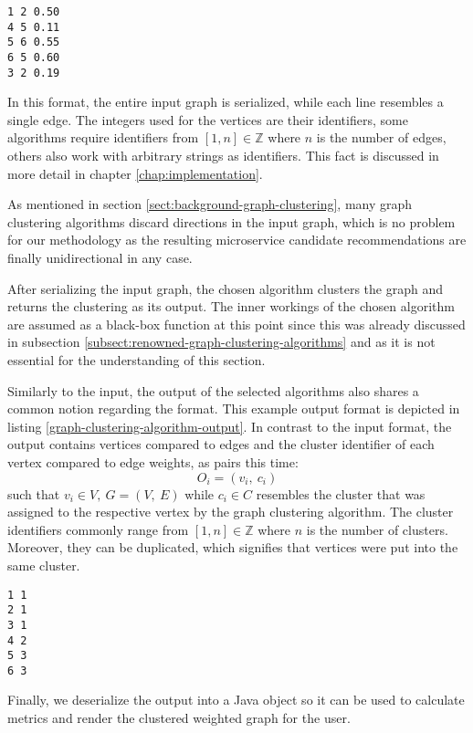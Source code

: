 \documentclass[12pt,a4paper]{report}
\begin{document}
\begin{lstlisting}[caption=Example graph clustering algorithm input, label=graph-clustering-algorithm-input, breaklines=true]
1 2 0.50
4 5 0.11
5 6 0.55
6 5 0.60
3 2 0.19
\end{lstlisting}

In this format, the entire input graph is serialized, while each line resembles
a single edge. The integers used for the vertices are their identifiers, some
algorithms require identifiers from \([1, n] \in \mathbb{Z}\) where \(n\) is
the number of edges, others also work with arbitrary strings as identifiers.
This fact is discussed in more detail in chapter \ref{chap:implementation}.

As mentioned in section \ref{sect:background-graph-clustering}, many graph
clustering algorithms discard directions in the input graph, which is no
problem for our methodology as the resulting microservice candidate
recommendations are finally unidirectional in any case.

After serializing the input graph, the chosen algorithm clusters the graph and
returns the clustering as its output. The inner workings of the chosen
algorithm are assumed as a black-box function at this point since this was
already discussed in subsection \ref{subsect:renowned-graph-clustering-algorithms}
and as it is not essential for the understanding of this section.

Similarly to the input, the output of the selected algorithms also shares a
common notion regarding the format. This example output format is depicted in
listing \ref{graph-clustering-algorithm-output}. In contrast to the input
format, the output contains vertices compared to edges and the cluster
identifier of each vertex compared to edge weights, as pairs this time:
\[
  O_i = (v_i, \ c_i)
\]
such that \(v_i \in V, \ G = (V, \ E)\) while \(c_i \in C\)
resembles the cluster that was assigned to the respective vertex by the graph
clustering algorithm. The cluster identifiers commonly range from \([1, n] \in
\mathbb{Z}\) where \(n\) is the number of clusters. Moreover, they can be
duplicated, which signifies that vertices were put into the same cluster.

\begin{lstlisting}[caption=Example graph clustering algorithm output, label=graph-clustering-algorithm-output, breaklines=true]
1 1
2 1
3 1
4 2
5 3
6 3
\end{lstlisting}

Finally, we deserialize the output into a Java object so it can be used to
calculate metrics and render the clustered weighted graph for the user.
\end{document}
